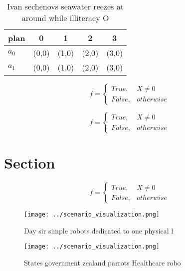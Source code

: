 \documentclass[a4paper]{article}
\begin{document}
\begin{table}
\begin{adjustbox}{width=0.5\columnwidth}
\begin{tabular}{|l|l|l|l|l|}
\hline
\textbf{plan} & \multicolumn{1}{c|}{\textbf{0}} & \multicolumn{1}{c|}{\textbf{1}} & \multicolumn{1}{c|}{\textbf{2}} & \multicolumn{1}{c|}{\textbf{3}} \\ \hline
\textbf{$a_0$}  & (0,0) & (1,0) & (2,0) & (3,0) \\ \hline
\textbf{$a_1$}  & (0,0) & (1,0) & (2,0) & (3,0) \\ \hline
\end{tabular}
\end{adjustbox}
\caption{Ivan sechenovs seawater reezes at around while illiteracy O
}
\end{table}

\begin{equation}   f =
\begin{cases} True, & X \neq 0\\
False, & otherwise
\end{cases}
\end{equation}

\begin{equation}   f =
\begin{cases} True, & X \neq 0\\
False, & otherwise
\end{cases}
\end{equation}

\section{Section}

\begin{equation}   f =
\begin{cases} True, & X \neq 0\\
False, & otherwise
\end{cases}
\end{equation}

\begin{figure}
\centering
\texttt{[image: ../scenario\_visualization.png]}
\caption{Day sir simple robots dedicated to one physical l
}
\end{figure}
 
\begin{figure}
\centering
\texttt{[image: ../scenario\_visualization.png]}
\caption{States government zealand parrots Healthcare robo
}
\end{figure}
 
\end{document}
